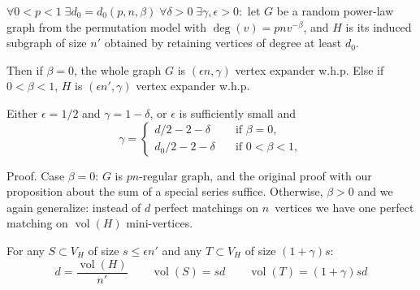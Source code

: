 \documentclass{beamer}
\DeclareMathOperator*{\vol}{vol}
\newcommand{\autotitle}{\secname\ifdefempty{\subsecname}{}{~--- \subsecname}}
\newcommand{\smalldisplayskips}{
    \setlength{\abovedisplayskip}{3pt}
    \setlength{\belowdisplayskip}{3pt}}
\begin{document}
\begin{frame}{\autotitle}
    \smalldisplayskips
    \begin{theorem}
        $\forall 0<p<1\;\exists d_0=d_0(p,n,\beta)\;\forall\delta>0\;\exists\gamma,\epsilon>0:$
        let $G$ be a random power-law graph from the permutation model with $\deg(v)=pnv^{-\beta}$,
        and $H$ is its induced subgraph of size $n'$ obtained by retaining vertices of degree at least $d_0$.
        
        Then if $\beta=0$, the whole graph $G$ is $(\epsilon n,\gamma)$ vertex expander w.h.p.
        Else if $0<\beta<1$, $H$ is $(\epsilon n',\gamma)$ vertex expander w.h.p.

        Either $\epsilon=1/2$ and $\gamma=1-\delta$,
        or $\epsilon$ is sufficiently small and
        \begin{equation*}
            \gamma=\begin{cases}
                d/2-2-\delta & \quad \text{if } \beta=0,\\
                d_0/2-2-\delta & \quad \text{if } 0<\beta<1,
            \end{cases}
        \end{equation*}
    \end{theorem}
\end{frame}

\begin{frame}{\autotitle}
    \begin{block}{Proof.}
        Case $\beta=0$: $G$ is $pn$-regular graph, and the original proof
        with our proposition about the sum of a special series suffice.
        Otherwise, $\beta>0$ and we again generalize:
        instead of $d$ perfect matchings on $n$~vertices
        we have one perfect matching on $\vol(H)$ mini-vertices.
        
        For any $S\subset V_H$ of size $s\leq\epsilon n'$
        and any $T\subset V_H$ of size $(1+\gamma)s$:
        \begin{equation*}
            d=\frac{\vol(H)}{n'}
            \qquad\vol(S)=sd
            \qquad\vol(T)=(1+\gamma)sd
        \end{equation*}
    \end{block}
\end{frame}
\end{document}
